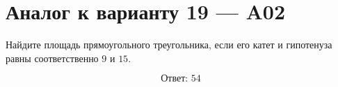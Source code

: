 


\section*{Аналог к варианту 19 — A02}
Найдите площадь прямоугольного треугольника, если его катет и гипотенуза равны соответственно \(9\) и \(15\).
\begin{center}\figRightTriangle\end{center}
\[\boxed{\text{Ответ: }54}\]

